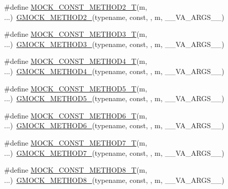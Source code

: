 \begin{DoxyCompactItemize}
\item 
\#define \hyperlink{gmock-generated-function-mockers_8h_a4337d7257aa4edff048aa406073b718b}{M\+O\+C\+K\+\_\+\+C\+O\+N\+S\+T\+\_\+\+M\+E\+T\+H\+O\+D2\+\_\+T}(m, ...)~\hyperlink{gmock-generated-function-mockers_8h_a885295ca6bebb15efb3fc786218c5d47}{G\+M\+O\+C\+K\+\_\+\+M\+E\+T\+H\+O\+D2\+\_\+}(typename, const, , m, \+\_\+\+\_\+\+V\+A\+\_\+\+A\+R\+G\+S\+\_\+\+\_\+)
\item 
\#define \hyperlink{gmock-generated-function-mockers_8h_a4c4c3417c197729f647fb0c700a41405}{M\+O\+C\+K\+\_\+\+C\+O\+N\+S\+T\+\_\+\+M\+E\+T\+H\+O\+D3\+\_\+T}(m, ...)~\hyperlink{gmock-generated-function-mockers_8h_af7c77ba511c631de02bb8c45a6ed3045}{G\+M\+O\+C\+K\+\_\+\+M\+E\+T\+H\+O\+D3\+\_\+}(typename, const, , m, \+\_\+\+\_\+\+V\+A\+\_\+\+A\+R\+G\+S\+\_\+\+\_\+)
\item 
\#define \hyperlink{gmock-generated-function-mockers_8h_a52290b1b841869d2d624b60ba1b6c3c4}{M\+O\+C\+K\+\_\+\+C\+O\+N\+S\+T\+\_\+\+M\+E\+T\+H\+O\+D4\+\_\+T}(m, ...)~\hyperlink{gmock-generated-function-mockers_8h_ab6430f2cfad9de4aca5258ea559294bb}{G\+M\+O\+C\+K\+\_\+\+M\+E\+T\+H\+O\+D4\+\_\+}(typename, const, , m, \+\_\+\+\_\+\+V\+A\+\_\+\+A\+R\+G\+S\+\_\+\+\_\+)
\item 
\#define \hyperlink{gmock-generated-function-mockers_8h_a37d02091cf2e4d31c11f38609d12a815}{M\+O\+C\+K\+\_\+\+C\+O\+N\+S\+T\+\_\+\+M\+E\+T\+H\+O\+D5\+\_\+T}(m, ...)~\hyperlink{gmock-generated-function-mockers_8h_a9e3ecd392499ab19a4a6d3adcabf56f6}{G\+M\+O\+C\+K\+\_\+\+M\+E\+T\+H\+O\+D5\+\_\+}(typename, const, , m, \+\_\+\+\_\+\+V\+A\+\_\+\+A\+R\+G\+S\+\_\+\+\_\+)
\item 
\#define \hyperlink{gmock-generated-function-mockers_8h_a18f8d1d9ac6c6684bd681342e130662b}{M\+O\+C\+K\+\_\+\+C\+O\+N\+S\+T\+\_\+\+M\+E\+T\+H\+O\+D6\+\_\+T}(m, ...)~\hyperlink{gmock-generated-function-mockers_8h_ad0ca7f6973a076d0af4c953f8ed91842}{G\+M\+O\+C\+K\+\_\+\+M\+E\+T\+H\+O\+D6\+\_\+}(typename, const, , m, \+\_\+\+\_\+\+V\+A\+\_\+\+A\+R\+G\+S\+\_\+\+\_\+)
\item 
\#define \hyperlink{gmock-generated-function-mockers_8h_a6e9ae85c17b12ba8882e06b3785d4582}{M\+O\+C\+K\+\_\+\+C\+O\+N\+S\+T\+\_\+\+M\+E\+T\+H\+O\+D7\+\_\+T}(m, ...)~\hyperlink{gmock-generated-function-mockers_8h_ab98a8399ba62b53b375c2807f4d39d2f}{G\+M\+O\+C\+K\+\_\+\+M\+E\+T\+H\+O\+D7\+\_\+}(typename, const, , m, \+\_\+\+\_\+\+V\+A\+\_\+\+A\+R\+G\+S\+\_\+\+\_\+)
\item 
\#define \hyperlink{gmock-generated-function-mockers_8h_a430c2eae077074190d4b380868d42944}{M\+O\+C\+K\+\_\+\+C\+O\+N\+S\+T\+\_\+\+M\+E\+T\+H\+O\+D8\+\_\+T}(m, ...)~\hyperlink{gmock-generated-function-mockers_8h_aa84a36427c44505207b7cad5dec7ad67}{G\+M\+O\+C\+K\+\_\+\+M\+E\+T\+H\+O\+D8\+\_\+}(typename, const, , m, \+\_\+\+\_\+\+V\+A\+\_\+\+A\+R\+G\+S\+\_\+\+\_\+)

\end{DoxyCompactItemize}
